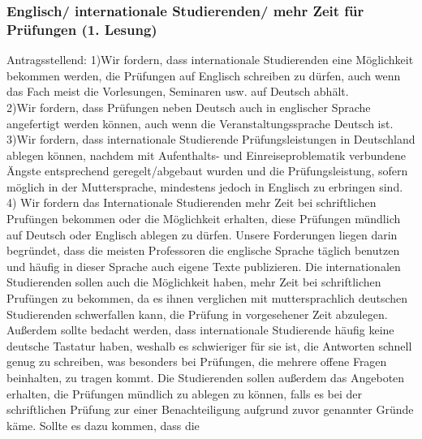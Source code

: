             \subsubsection{Englisch/ internationale Studierenden/ mehr Zeit für Prüfungen \label{corona:3.2} (1. Lesung)}
            Antragsstellend: 
            1)Wir fordern, dass internationale Studierenden eine Möglichkeit bekommen werden, die
            Prüfungen
            auf Englisch schreiben zu dürfen, auch wenn das Fach meist die Vorlesungen, Seminaren
            usw. auf
            Deutsch abhält.\\
            2)Wir fordern, dass Prüfungen neben Deutsch auch in englischer Sprache angefertigt
            werden
            können, auch wenn die Veranstaltungssprache Deutsch ist.\\
            3)Wir fordern, dass internationale Studierende Prüfungsleistungen in Deutschland
            ablegen können,
            nachdem mit Aufenthalts- und Einreiseproblematik verbundene Ängste entsprechend
            geregelt/abgebaut wurden und die Prüfungsleistung, sofern möglich in der
            Muttersprache,
            mindestens jedoch in Englisch zu erbringen sind.\\
            4) Wir fordern das Internationale Studierenden mehr Zeit bei schriftlichen Prufüngen
            bekommen
            oder die Möglichkeit erhalten, diese Prüfungen mündlich auf Deutsch oder Englisch
            ablegen zu
            dürfen.
            Unsere Forderungen liegen darin begründet, dass die meisten Professoren die englische Sprache
            täglich benutzen und häufig in dieser Sprache auch eigene Texte publizieren. Die internationalen
            Studierenden sollen auch die Möglichkeit haben, mehr Zeit bei schriftlichen Prufüngen zu
            bekommen, da es ihnen verglichen mit muttersprachlich deutschen Studierenden schwerfallen
            kann, die Prüfung in vorgesehener Zeit abzulegen. Außerdem sollte bedacht werden, dass
            internationale Studierende häufig keine deutsche Tastatur haben, weshalb es schwieriger für sie ist,
            die Antworten schnell genug zu schreiben, was besonders bei Prüfungen, die mehrere offene Fragen
            beinhalten, zu tragen kommt. Die Studierenden sollen außerdem das Angeboten erhalten, die
            Prüfungen mündlich zu ablegen zu können, falls es bei der schriftlichen Prüfung zur einer
            Benachteiligung aufgrund zuvor genannter Gründe käme. Sollte es dazu kommen, dass die
